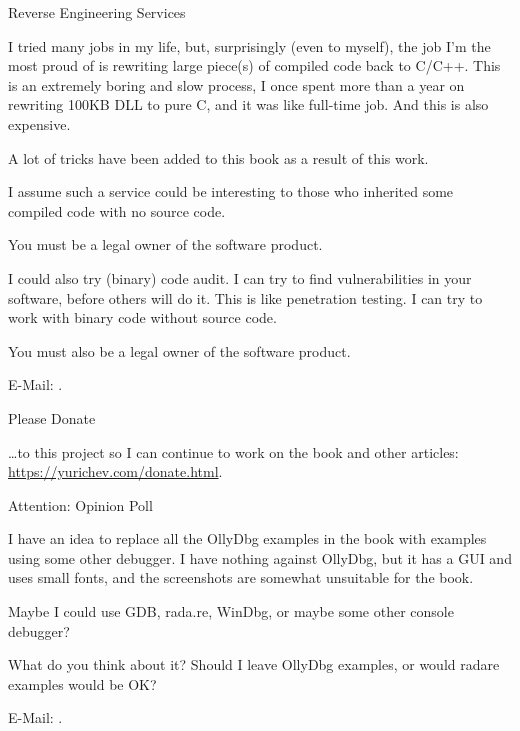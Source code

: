 \vspace*{\fill}

\huge Reverse Engineering Services
\normalsize

\bigskip
\bigskip
\bigskip

I tried many jobs in my life, but, surprisingly (even to myself),
the job I'm the most proud of is rewriting large piece(s) of compiled code back to C/C++.
This is an extremely boring and slow process, I once spent more than a year on rewriting 100KB DLL to pure C,
and it was like full-time job.
And this is also expensive.

A lot of tricks have been added to this book as a result of this work.

I assume such a service could be interesting to those who inherited some compiled code with no source code.

You must be a legal owner of the software product.

\bigskip

I could also try (binary) code audit.
I can try to find vulnerabilities in your software, before others will do it.
This is like penetration testing.
I can try to work with binary code without source code.

You must also be a legal owner of the software product.

E-Mail: \GTT{\EMAIL}.

\bigskip
\bigskip
\bigskip

\huge Please Donate
\normalsize

\bigskip
\bigskip
\bigskip

\dots to this project so I can continue to work on the book and other articles: \\
\url{https://yurichev.com/donate.html}.

\bigskip
\bigskip
\bigskip

\huge Attention: Opinion Poll
\normalsize

\bigskip
\bigskip
\bigskip

I have an idea to replace all the OllyDbg examples in the book with examples using some other debugger.
I have nothing against OllyDbg, but it has a GUI and uses small fonts, and the screenshots are somewhat unsuitable for the book.

Maybe I could use GDB, rada.re, WinDbg, or maybe some other console debugger?

What do you think about it?
Should I leave OllyDbg examples, or would radare examples would be OK?

E-Mail: \GTT{\EMAIL}.

\vspace*{\fill}
\vfill
